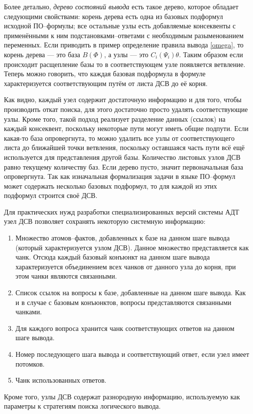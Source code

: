 Более детально, \emph{дерево состояний вывода} есть такое дерево, которое обладает следующими свойствами: корень дерева есть одна из базовых подформул исходной ПО--формулы; все остальные узлы есть добавляемые консеквенты с применёнными к ним подстановками--ответами с необходимым разыменованием переменных. Если приводить в пример определение правила вывода \ref{omega}, то корень дерева --- это база $B(\Phi)$, а узлы --- это $C_i(\Psi_i)\theta$. Таким образом если происходит расщепление базы то в соответствующем узле появляется ветвление. Теперь можно говорить, что каждая базовая подформула в формуле характеризуется соответствующим путём от листа ДСВ до её корня.

Как видно, каждый узел содержит достаточную информацию и для того, чтобы производить откат поиска, для этого достаточно просто удалять соответствующие узлы. Кроме того, такой подход реализует разделение данных (ссылок) на каждый консеквент, поскольку некоторые пути могут иметь общие подпути. Если какая-то база опровергнута, то можно удалить все узлы от соответствующего листа до ближайшей точки ветвления, поскольку оставшаяся часть пути всё ещё используется для представления другой базы. Количество листовых узлов ДСВ равно текущему количеству баз. Если дерево пусто, значит первоначальная база опровергнута. Так как изначальная формализация задачи в языке ПО--формул может содержать несколько базовых подформул, то для каждой из этих подформул строится своё ДСВ.

Для практических нужд разработки специализированных версий системы АДТ узел ДСВ позволяет сохранять некоторую системную информацию:
\begin{enumerate}
\item Множество атомов--фактов, добавленных к базе на данном шаге вывода (который характеризуется узлом ДСВ). Данное множество представляется как чанк. Отсюда каждый базовый конъюнкт на данном шаге вывода характеризуется объединением всех чанков от данного узла до корня, при этом чанки являются связанными.
\item Список ссылок на вопросы к базе, добавленные на данном шаге вывода. Как и в случае с базовым конъюнктов, вопросы представляются связанными чанками.
\item Для каждого вопроса хранится чанк соответствующих ответов на данном шаге вывода.
\item Номер последующего шага вывода и соответствующий ответ, если узел имеет потомков.
\item Чанк использованных ответов.
\end{enumerate}
Кроме того, узлы ДСВ содержат разнородную информацию, используемую как параметры к стратегиям поиска логического вывода.

